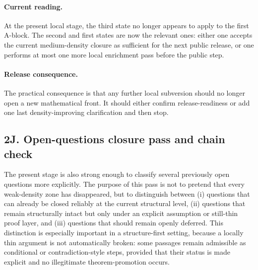 \documentclass[12pt,a4paper]{article}
\begin{document}
\paragraph{Current reading.}
At the present local stage, the third state no longer appears to apply to the first A-block. The second and first states are now the relevant ones: either one accepts the current medium-density closure as sufficient for the next public release, or one performs at most one more local enrichment pass before the public step.

\paragraph{Release consequence.}
The practical consequence is that any further local subversion should no longer open a new mathematical front. It should either confirm release-readiness or add one last density-improving clarification and then stop.




\subsection*{2J. Open-questions closure pass and chain check}
The present stage is also strong enough to classify several previously open questions more explicitly. The purpose of this pass is not to pretend that every weak-density zone has disappeared, but to distinguish between (i) questions that can already be closed reliably at the current structural level, (ii) questions that remain structurally intact but only under an explicit assumption or still-thin proof layer, and (iii) questions that should remain openly deferred. This distinction is especially important in a structure-first setting, because a locally thin argument is not automatically broken: some passages remain admissible as conditional or contradiction-style steps, provided that their status is made explicit and no illegitimate theorem-promotion occurs.
\end{document}
